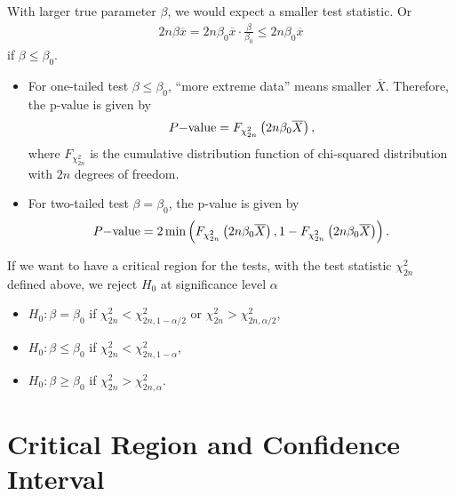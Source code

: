 With larger true parameter $\beta$, we would expect a smaller test statistic. Or
\begin{align*}
2n\beta\overline{x} = 2n\beta_0\overline{x} \cdot \frac{\beta}{\beta_0} \leq 2n\beta_0\overline{x}
\end{align*}
if $\beta \leq\beta_0$.
\begin{itemize}
	\item For one-tailed test $\beta\leq \beta_0$, ``more extreme data'' means smaller $\overline{X}$. Therefore, the p-value is given by
	\begin{align*}
	P\mathrm{-value} = F_{\chi_{2n}^2}\left(2n\beta_0\overline{X} \right),
	\end{align*}
	where $F_{\chi_{2n}^2}$ is the cumulative distribution function of chi-squared distribution with $2n$ degrees of freedom.
	\item For two-tailed test $\beta = \beta_0$, the p-value is given by
	\begin{align*}
	P\mathrm{-value} = 2\min\left(F_{\chi_{2n}^2}\left(2n\beta_0\overline{X} \right), 1-F_{\chi_{2n}^2}\left(2n\beta_0\overline{X} \right) \right).
	\end{align*}
\end{itemize}
If we want to have a critical region for the tests, with the test statistic $\chi_{2n}^2$ defined above, we reject $H_0$ at significance level $\alpha$
\begin{itemize}
	\item $H_0: \beta = \beta_0$ if $\chi_{2n}^2 < \chi_{2n, 1-\alpha/2}^2$ or $\chi_{2n}^2 > \chi_{2n, \alpha/2}^2$,
	\item $H_0: \beta \leq \beta_0$ if $\chi_{2n}^2 < \chi_{2n, 1-\alpha}^2$,
	\item $H_0: \beta \geq \beta_0$ if $\chi_{2n}^2 > \chi_{2n, \alpha}^2$.
\end{itemize}

\section*{Critical Region and Confidence Interval}

